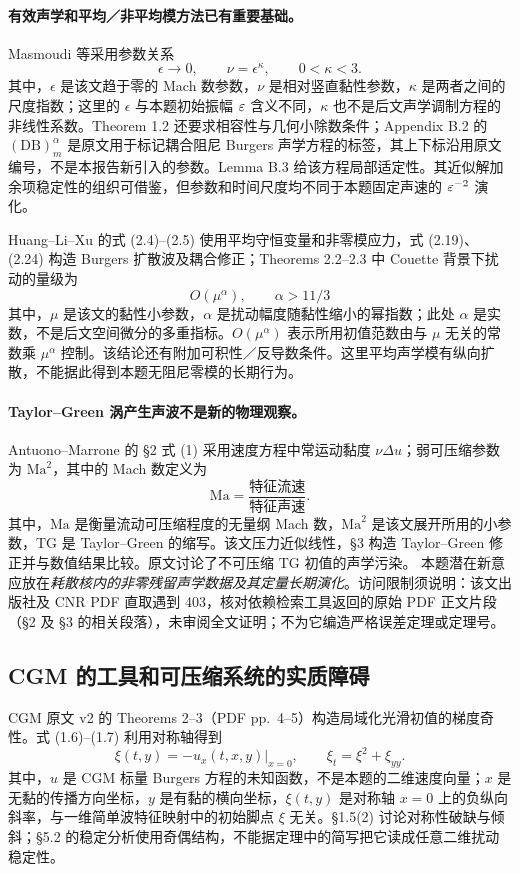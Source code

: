 \paragraph{有效声学和平均／非平均模方法已有重要基础。}
Masmoudi 等采用参数关系
\[
 \epsilon\to0,\qquad \nu=\epsilon^\kappa,\qquad 0<\kappa<3.
\]
其中，$\epsilon$ 是该文趋于零的 Mach 数参数，$\nu$ 是相对竖直黏性参数，$\kappa$ 是两者之间的尺度指数；这里的 $\epsilon$ 与本题初始振幅 $\varepsilon$ 含义不同，$\kappa$ 也不是后文声学调制方程的非线性系数。Theorem 1.2 还要求相容性与几何小除数条件；Appendix B.2 的 $(\mathrm{DB})_m^\alpha$ 是原文用于标记耦合阻尼 Burgers 声学方程的标签，其上下标沿用原文编号，不是本报告新引入的参数。Lemma B.3 给该方程局部适定性。其近似解加余项稳定性的组织可借鉴，但参数和时间尺度均不同于本题固定声速的 $\varepsilon^{-2}$ 演化。\cite{MSWZ}

Huang--Li--Xu 的式 (2.4)--(2.5) 使用平均守恒变量和非零模应力，式 (2.19)、(2.24) 构造 Burgers 扩散波及耦合修正；Theorems 2.2--2.3 中 Couette 背景下扰动的量级为
\[
 O(\mu^\alpha),\qquad \alpha>11/3
\]
其中，$\mu$ 是该文的黏性小参数，$\alpha$ 是扰动幅度随黏性缩小的幂指数；此处 $\alpha$ 是实数，不是后文空间微分的多重指标。$O(\mu^\alpha)$ 表示所用初值范数由与 $\mu$ 无关的常数乘 $\mu^\alpha$ 控制。该结论还有附加可积性／反导数条件。这里平均声学模有纵向扩散，不能据此得到本题无阻尼零模的长期行为。\cite{HLX}

\paragraph{Taylor--Green 涡产生声波不是新的物理观察。}
Antuono--Marrone 的 \S2 式 (1) 采用速度方程中常运动黏度 $\nu\Delta u$；弱可压缩参数为 $\mathrm{Ma}^2$，其中的 Mach 数定义为
\[
 \mathrm{Ma}=\frac{\text{特征流速}}{\text{特征声速}}.
\]
其中，$\mathrm{Ma}$ 是衡量流动可压缩程度的无量纲 Mach 数，$\mathrm{Ma}^2$ 是该文展开所用的小参数，TG 是 Taylor--Green 的缩写。该文压力近似线性，\S3 构造 Taylor--Green 修正并与数值结果比较。原文讨论了不可压缩 TG 初值的声学污染。\cite{AM}
本题潜在新意应放在\emph{耗散核内的非零残留声学数据及其定量长期演化}。访问限制须说明：该文出版社及 CNR PDF 直取遇到 403，核对依赖检索工具返回的原始 PDF 正文片段（\S2 及 \S3 的相关段落），未审阅全文证明；不为它编造严格误差定理或定理号。

\subsection{CGM 的工具和可压缩系统的实质障碍}
CGM 原文 v2 的 Theorems 2--3（PDF pp.~4--5）构造局域化光滑初值的梯度奇性。式 (1.6)--(1.7) 利用对称轴得到
\[
 \xi(t,y)=-\left.u_x(t,x,y)\right|_{x=0},\qquad
 \xi_t=\xi^2+\xi_{yy}.
\]
其中，$u$ 是 CGM 标量 Burgers 方程的未知函数，不是本题的二维速度向量；$x$ 是无黏的传播方向坐标，$y$ 是有黏的横向坐标，$\xi(t,y)$ 是对称轴 $x=0$ 上的负纵向斜率，与一维简单波特征映射中的初始脚点 $\xi$ 无关。\S1.5(2) 讨论对称性破缺与倾斜；\S5.2 的稳定分析使用奇偶结构，不能据定理中的简写把它读成任意二维扰动稳定性。\cite{CGM}

